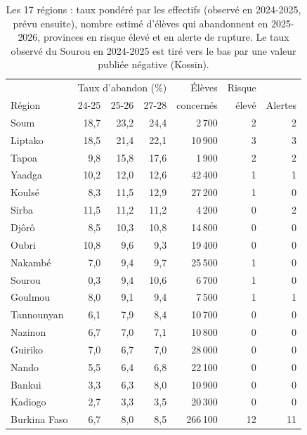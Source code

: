 \documentclass{article}
\begin{document}
\begin{table}[!htbp]
\centering
\footnotesize
\setlength{\tabcolsep}{4pt}
\begin{tabular}{@{}l r r r r r r@{}}
\toprule
& \multicolumn{3}{c}{Taux d'abandon (\%)} & Élèves & Risque & \\
Région & 24-25 & 25-26 & 27-28 & concernés & élevé & Alertes \\
\midrule
Soum & 18,7 & 23,2 & 24,4 & 2\,700 & 2 & 2 \\
Liptako & 18,5 & 21,4 & 22,1 & 10\,900 & 3 & 3 \\
Tapoa & 9,8 & 15,8 & 17,6 & 1\,900 & 2 & 2 \\
Yaadga & 10,2 & 12,0 & 12,6 & 42\,400 & 1 & 1 \\
Koulsé & 8,3 & 11,5 & 12,9 & 27\,200 & 1 & 0 \\
Sirba & 11,5 & 11,2 & 11,2 & 4\,200 & 0 & 2 \\
Djôrô & 8,5 & 10,3 & 10,8 & 14\,800 & 0 & 0 \\
Oubri & 10,8 & 9,6 & 9,3 & 19\,400 & 0 & 0 \\
Nakambé & 7,0 & 9,4 & 9,7 & 25\,500 & 1 & 0 \\
Sourou & 0,3 & 9,4 & 10,6 & 6\,700 & 1 & 0 \\
Goulmou & 8,0 & 9,1 & 9,4 & 7\,500 & 1 & 1 \\
Tannounyan & 6,1 & 7,9 & 8,4 & 10\,700 & 0 & 0 \\
Nazinon & 6,7 & 7,0 & 7,1 & 10\,800 & 0 & 0 \\
Guiriko & 7,0 & 6,7 & 7,0 & 28\,000 & 0 & 0 \\
Nando & 5,5 & 6,4 & 6,8 & 22\,100 & 0 & 0 \\
Bankui & 3,3 & 6,3 & 8,0 & 10\,900 & 0 & 0 \\
Kadiogo & 2,7 & 3,3 & 3,5 & 20\,300 & 0 & 0 \\
\midrule
Burkina Faso & 6,7 & 8,0 & 8,5 & 266\,100 & 12 & 11 \\
\bottomrule
\end{tabular}
\caption{Les 17 régions : taux pondéré par les effectifs (observé en 2024-2025, prévu ensuite), nombre estimé d'élèves qui abandonnent en 2025-2026, provinces en risque élevé et en alerte de rupture. Le taux observé du Sourou en 2024-2025 est tiré vers le bas par une valeur publiée négative (Kossin).}
\label{tab:regions}
\end{table}
\end{document}
